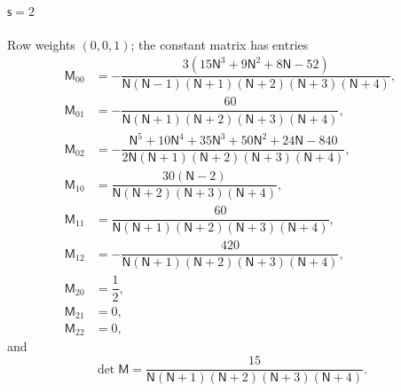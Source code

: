 \documentclass{amsart}
\theoremstyle{definition}
\theoremstyle{remark}
\numberwithin{equation}{section}
\begin{document}
\paragraph{$\mathsf s=2$} Row weights $(0,0,1)$; the constant matrix has entries
{\small\allowdisplaybreaks\begin{align*}
  \mathsf M_{00}&=-\dfrac{3(15\mathsf N^{3} + 9\mathsf N^{2} + 8\mathsf N - 52)}{\mathsf N(\mathsf N - 1)(\mathsf N + 1)(\mathsf N + 2)(\mathsf N + 3)(\mathsf N + 4)},\\
  \mathsf M_{01}&=-\dfrac{60}{\mathsf N(\mathsf N + 1)(\mathsf N + 2)(\mathsf N + 3)(\mathsf N + 4)},\\
  \mathsf M_{02}&=-\dfrac{\mathsf N^{5} + 10\mathsf N^{4} + 35\mathsf N^{3} + 50\mathsf N^{2} + 24\mathsf N - 840}{2\mathsf N(\mathsf N + 1)(\mathsf N + 2)(\mathsf N + 3)(\mathsf N + 4)},\\
  \mathsf M_{10}&=\dfrac{30(\mathsf N - 2)}{\mathsf N(\mathsf N + 2)(\mathsf N + 3)(\mathsf N + 4)},\\
  \mathsf M_{11}&=\dfrac{60}{\mathsf N(\mathsf N + 1)(\mathsf N + 2)(\mathsf N + 3)(\mathsf N + 4)},\\
  \mathsf M_{12}&=-\dfrac{420}{\mathsf N(\mathsf N + 1)(\mathsf N + 2)(\mathsf N + 3)(\mathsf N + 4)},\\
  \mathsf M_{20}&=\dfrac{1}{2},\\
  \mathsf M_{21}&=0,\\
  \mathsf M_{22}&=0,
\end{align*}}
and
\[\det\mathsf M=\frac{15}{\mathsf N(\mathsf N + 1)(\mathsf N + 2)(\mathsf N + 3)(\mathsf N + 4)}.\]
\end{document}
